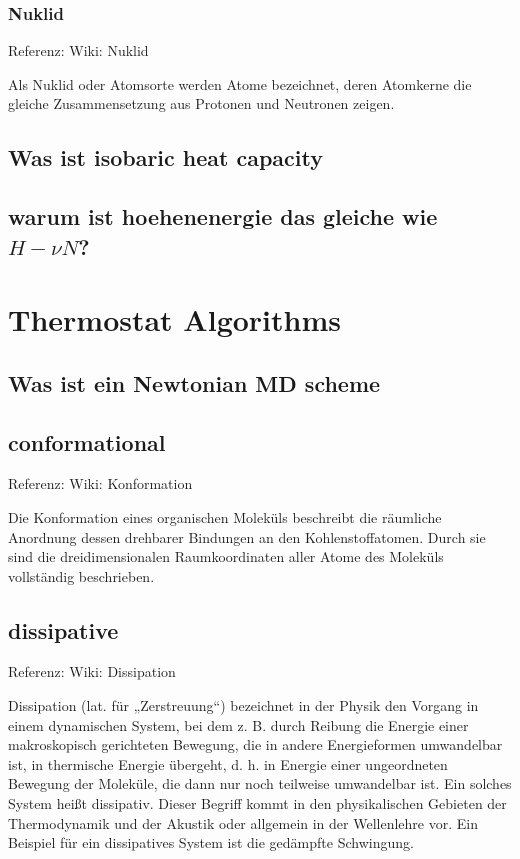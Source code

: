 \documentclass[]{article}
\begin{document}
\subsubsection*{Nuklid}
Referenz: Wiki: Nuklid

Als Nuklid oder Atomsorte werden Atome bezeichnet, deren Atomkerne die gleiche Zusammensetzung aus Protonen und Neutronen zeigen.


\subsection{Was ist \glqq isobaric heat capacity \grqq }

\subsection{warum ist hoehenenergie das gleiche wie $H-\nu N$?}



\section{Thermostat Algorithms}

\subsection{Was ist ein \glqq Newtonian MD scheme \grqq}


\subsection{conformational}
Referenz: Wiki: Konformation

Die Konformation eines organischen Moleküls beschreibt die räumliche Anordnung dessen drehbarer Bindungen an den Kohlenstoffatomen. Durch sie sind die dreidimensionalen Raumkoordinaten aller Atome des Moleküls vollständig beschrieben.

\subsection{dissipative}
Referenz: Wiki: Dissipation

Dissipation (lat. für „Zerstreuung“) bezeichnet in der Physik den Vorgang in einem dynamischen System, bei dem z. B. durch Reibung die Energie einer makroskopisch gerichteten Bewegung, die in andere Energieformen umwandelbar ist, in thermische Energie übergeht, d. h. in Energie einer ungeordneten Bewegung der Moleküle, die dann nur noch teilweise umwandelbar ist. Ein solches System heißt dissipativ. Dieser Begriff kommt in den physikalischen Gebieten der Thermodynamik und der Akustik oder allgemein in der Wellenlehre vor. Ein Beispiel für ein dissipatives System ist die gedämpfte Schwingung.
\end{document}
